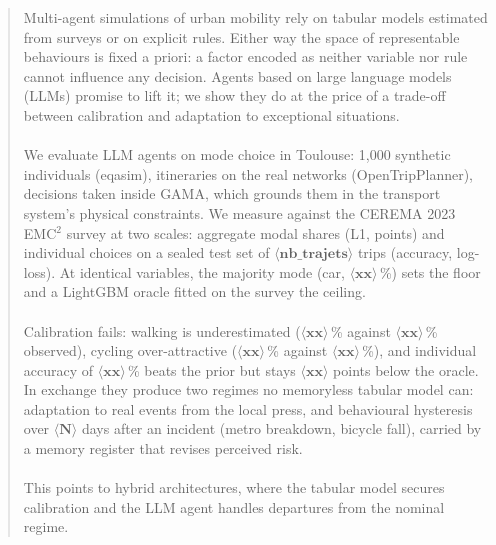 
\begin{abstract}
Multi-agent simulations of urban mobility rely on tabular models estimated from surveys or on explicit rules. Either way the space of representable behaviours is fixed a priori: a factor encoded as neither variable nor rule cannot influence any decision. Agents based on large language models (LLMs) promise to lift it; we show they do at the price of a trade-off between calibration and adaptation to exceptional situations.
\\\\We evaluate LLM agents on mode choice in Toulouse: 1,000 synthetic individuals (eqasim), itineraries on the real networks (OpenTripPlanner), decisions taken inside GAMA, which grounds them in the transport system's physical constraints. We measure against the CEREMA 2023 EMC$^2$ survey at two scales: aggregate modal shares (L1, points) and individual choices on a sealed test set of $\langle \textbf{nb\_trajets} \rangle$ trips (accuracy, log-loss). At identical variables, the majority mode (car, $\langle \textbf{xx} \rangle$\,\%) sets the floor and a LightGBM oracle fitted on the survey the ceiling.
\\\\Calibration fails: walking is underestimated ($\langle \textbf{xx} \rangle$\,\% against $\langle \textbf{xx} \rangle$\,\% observed), cycling over-attractive ($\langle \textbf{xx} \rangle$\,\% against $\langle \textbf{xx} \rangle$\,\%), and individual accuracy of $\langle \textbf{xx} \rangle$\,\% beats the prior but stays $\langle \textbf{xx} \rangle$ points below the oracle. In exchange they produce two regimes no memoryless tabular model can: adaptation to real events from the local press, and behavioural hysteresis over $\langle \textbf{N} \rangle$ days after an incident (metro breakdown, bicycle fall), carried by a memory register that revises perceived risk.
\\\\This points to hybrid architectures, where the tabular model secures calibration and the LLM agent handles departures from the nominal regime.
\end{abstract}
